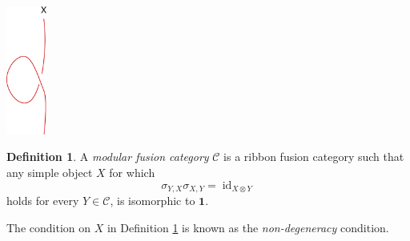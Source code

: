 \documentclass[a4paper, 10pt]{book}
\theoremstyle{definition}
\newtheorem{defn}[theorem]{Definition}
\numberwithin{equation}{chapter}
\newcommand\id{\operatorname{id}}
\newcommand\Cat{\mathcal C}
\newcommand\one{\mathbf{1}}
\begin{document}
\begin{center}
\includegraphics[width=0.1\textwidth]{t-matrix.eps}
\end{center}
\begin{defn}\label{mfcdef}\rm
A \textit{modular fusion category} $\Cat$ is a ribbon fusion category such that any simple object $X$ for which \begin{equation}\label{muger}
	\sigma_{Y,X}\sigma_{X,Y}= \id_{X\otimes Y}\end{equation}
 holds for every $Y\in \Cat$, is isomorphic to $\one$.
\end{defn}
The condition on $X$ in Definition \ref{mfcdef} is known as the \textit{non-degeneracy} condition.
 
\end{document}
